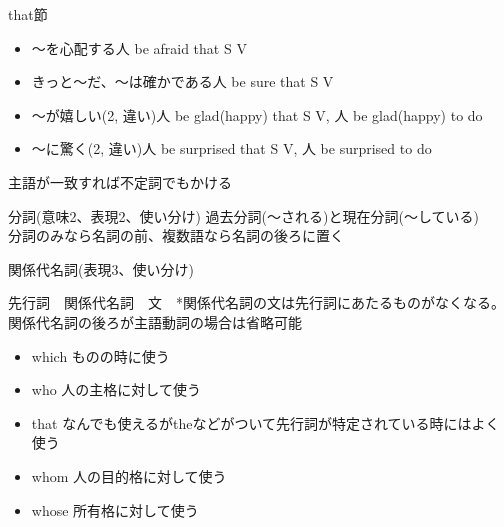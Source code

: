 \documentclass[10pt]{jsarticle}
\newcommand{\answer}[2]{{\color{orange}#2}}
\newcommand{\question}[2]{{\color{orange}#2}}
\newcommand{\answer}[2]{\vspace{#1mm}}
\newcommand{\question}[2]{#1}
\begin{document}
\begin{itembox}[l]{that節}
	\begin{itemize}
		\item 〜を心配する\answer{0}{人 be afraid that S V}
		\item きっと〜だ、〜は確かである\answer{0}{人 be sure that S V}
		\item 〜が嬉しい(2, 違い)\answer{0}{人 be glad(happy) that S V, 人 be glad(happy) to do}
		\item 〜に驚く(2, 違い)\answer{0}{人 be surprised that S V, 人 be surprised to do}
	\end{itemize}
	\answer{0}{主語が一致すれば不定詞でもかける}
\end{itembox}

\begin{itembox}[l]{分詞(意味2、表現2、使い分け)}
	\question{
		\begin{multicols}{2}
			\begin{itemize}
				\item 意味(使い分け)
				      \begin{itemize}
					      \item \item
				      \end{itemize}
				\item 語順
				      \begin{itemize}
					      \item \item
				      \end{itemize}
			\end{itemize}
		\end{multicols}
	}{
		過去分詞(〜される)と現在分詞(〜している)\\
		分詞のみなら名詞の前、複数語なら名詞の後ろに置く}
\end{itembox}

\begin{itembox}[l]{関係代名詞(表現3、使い分け)}
	\question{
		\begin{multicols}{3}
			\begin{itemize}
				\item\item\item\item\item
			\end{itemize}
		\end{multicols}
	}{
		先行詞　関係代名詞　文　*関係代名詞の文は先行詞にあたるものがなくなる。\\
		関係代名詞の後ろが主語動詞の場合は省略可能
		\begin{itemize}
			\item which  ものの時に使う
			\item who 人の主格に対して使う
			\item that なんでも使えるがtheなどがついて先行詞が特定されている時にはよく使う
			\item whom 人の目的格に対して使う
			\item whose 所有格に対して使う
		\end{itemize}
	}
\end{itembox}
\end{document}
